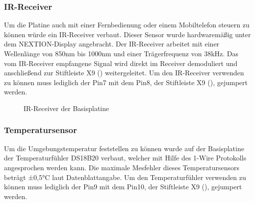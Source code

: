 \subsubsection{IR-Receiver}
Um die Platine auch mit einer Fernbedienung oder einem Mobiltelefon steuern zu können würde ein IR-Receiver verbaut. Dieser Sensor wurde hardwaremäßig unter dem NEXTION-Display angebracht. Der IR-Receiver arbeitet mit einer Wellenlänge von 850nm bis 1000nm und einer Trägerfrequenz von 38kHz. Das vom IR-Receiver empfangene Signal wird direkt im Receiver demoduliert und anschließend zur Stiftleiste X9 () weitergeleitet. Um den IR-Receiver verwenden zu können muss lediglich der Pin7 mit dem Pin8, der Stiftleiste X9 (), gejumpert werden.

\begin{figure}[H]
    \centering
    \qquad
    \qquad
    \caption[IR-Receiver der Basisplatine]{IR-Receiver der \gls{Basisplatine}}
    \label{fig:basisplatine-ir}
\end{figure}

\subsubsection{Temperatursensor}
Um die Umgebungstemperatur feststellen zu können wurde auf der Basisplatine der Temperaturfühler DS18B20 verbaut, welcher mit Hilfe des 1-Wire Protokolls angesprochen werden kann. Die maximale Mesfehler dieses Temperatursensors beträgt ±0,5°C laut Datenblattangabe. Um den Temperaturfühler verwenden zu können muss lediglich der Pin9 mit dem Pin10, der Stiftleiste X9 (), gejumpert werden.

